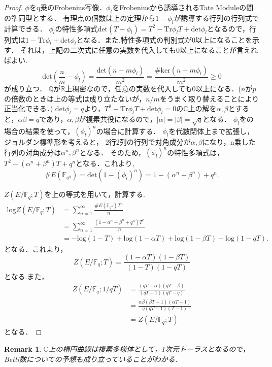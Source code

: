 \documentclass{ujarticle}
\newtheorem*{rem}{Remark}
\begin{document}
\begin{proof}
 $\phi$をq乗のFrobenius写像．$\phi_l$をFrobeniusから誘導されるTate Moduleの間の準同型とする．
 有理点の個数は上の定理から$1 - \phi_l$が誘導する行列の行列式で計算できる．
 $\phi_l$の特性多項式$\mathrm{det}(T - \phi_l)=T^2 -\mathrm{Tr}\phi_l T+ \mathrm{det}\phi_l$となるので，行列式は$1-\mathrm{Tr}\phi_l+ \mathrm{det}\phi_l$となる．また,特性多項式の判別式が0以上になることを示す．
 それは，上記の二次式に任意の実数を代入しても0以上になることが言えればよい.
 \begin{equation*}
  \mathrm{det}(\frac{n}{m} - \phi_l)=\frac{\mathrm{det}(n -m \phi_l)}{m^2}
  = \frac{\#\mathrm{ker}(n -m \phi_l)}{m^2} \ge 0
 \end{equation*}
が成り立つ．
$\mathbb{Q}$が$\mathbb{R}$上稠密なので，任意の実数を代入しても0以上になる．($n$が$p$の倍数のときは上の等式は成り立たないが，$n/m$をうまく取り替えることにより正当化できる．)
$\mathrm{det}\phi_l=q$より，$T^2 -\mathrm{Tr}\phi_l T+ \mathrm{det}\phi_l=0$の$\mathbb{C}$上の解を$\alpha,\beta$とすると，$\alpha \beta=q$であり，$\alpha,\beta$が複素共役になるので，$|\alpha|=|\beta|=\sqrt{q}$となる．
$\phi_l$をの場合の結果を使って，$(\phi_l)^n$の場合に計算する．
$\phi_l$を代数閉体上まで拡張し，ジョルダン標準形を考えると，
2行2列の行列で対角成分が$\alpha,\beta$になり，n乗した行列の対角成分は$\alpha^n,\beta^n$となる．
そのため，$(\phi_l)^n$の特性多項式は，$T^2-(\alpha^n + \beta^n)T +q^n$となる．これより,
\begin{equation*}
  \#E(\mathbb{F}_{q^n})=\mathrm{det}(1- (\phi_l)^n)=1-(\alpha^n + \beta^n) +q^n.
\end{equation*}

$Z(E/\mathbb{F}_q;T)$を上の等式を用いて，計算する.
\begin{align*}
  \mathrm{log}Z(E/\mathbb{F}_q;T) &= \sum_{n=1}^{\infty} \frac{\# E(\mathbb{F}_{q^n})T^n}{n} \\
  &= \sum_{n=1}^{\infty} \frac{(1 - \alpha^n -\beta^n + q^n)T^n}{n} \\
  &= -\mathrm{log}(1-T) + \mathrm{log}(1- \alpha T)+ \mathrm{log}(1- \beta T) - \mathrm{log}(1 -qT).
\end{align*}
となる．これより，
\begin{equation*}
 Z(E/\mathbb{F}_q;T)=\frac{(1- \alpha T)(1- \beta T)}{(1-T)(1-qT)}
\end{equation*}
となる.また，
\begin{align*}
  Z(E/\mathbb{F}_q;1/qT) &= \frac{(qT -\alpha)(qT -\beta)}{(q T - 1)(qT -q)} \\
  &= \frac{\alpha \beta(\beta T - 1)(\alpha T - 1)}{q(q T - 1)(T -1)}　\\
  &= Z(E/\mathbb{F}_q;T)
\end{align*}
となる．
\end{proof}
\begin{rem}
 $\mathbb{C}$上の楕円曲線は複素多様体として，1次元トーラスとなるので，
 Betti数についての予想も成り立っていることがわかる．
\end{rem}
\end{document}
